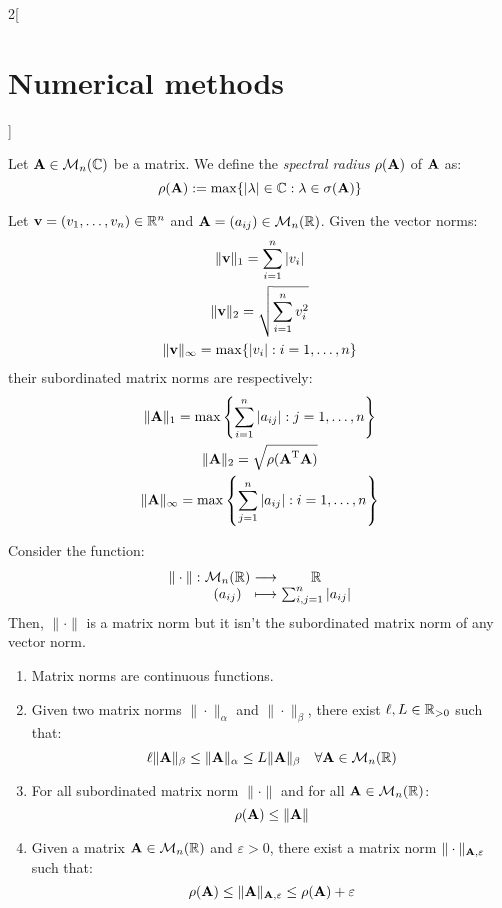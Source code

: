 \documentclass[../../../main_math.tex]{subfiles}
\begin{document}
\begin{multicols}{2}[\section{Numerical methods}]
\begin{definition}
    Let $\boldsymbol{\mathrm{A}}\in\mathcal{M}_n(\mathbb{C})$ be a matrix. We define the \emph{spectral radius} $\rho(\boldsymbol{\mathrm{A}})$ of $\boldsymbol{\mathrm{A}}$ as: $$\rho(\boldsymbol{\mathrm{A}}):=\max\{|\lambda|\in\mathbb{C}:\lambda\in\sigma(\boldsymbol{\mathrm{A}})\}$$
  \end{definition}
  \begin{proposition}
    Let $\boldsymbol{\mathrm{v}}=(v_1,\ldots,v_n)\in\mathbb{R}^n$ and $\boldsymbol{\mathrm{A}}=(a_{ij})\in\mathcal{M}_n(\mathbb{R})$. Given the vector norms:
    \begin{gather*}
      \|\boldsymbol{\mathrm{v}}\|_1=\sum_{i=1}^n|v_i|\\
      \|\boldsymbol{\mathrm{v}}\|_2=\sqrt{\sum_{i=1}^nv_i^2}\\
      \|\boldsymbol{\mathrm{v}}\|_\infty=\max\{|v_i|:i=1,\ldots,n\}
    \end{gather*}
    their subordinated matrix norms are respectively:
    \begin{gather*}
      \|\boldsymbol{\mathrm{A}}\|_1=\max\left\{\sum_{i=1}^n|a_{ij}|:j=1,\ldots,n\right\}\\
      \|\boldsymbol{\mathrm{A}}\|_2=\sqrt{\rho({\boldsymbol{\mathrm{A}}}^{\mathrm{T}}\boldsymbol{\mathrm{A}})}\\
      \|\boldsymbol{\mathrm{A}}\|_\infty=\max\left\{\sum_{j=1}^n|a_{ij}|:i=1,\ldots,n\right\}
    \end{gather*}
  \end{proposition}
  \begin{proposition}
    Consider the function: $$\function{\|\cdot\|}{\mathcal{M}_n(\RR)}{\RR}{(a_{ij})}{\sum_{i,j=1}^n|a_{ij}|}$$ Then, $\|\cdot\|$ is a matrix norm but it isn't the subordinated matrix norm of any vector norm.
  \end{proposition}
  \begin{proposition}
    \hfill
    \begin{enumerate}
      \item Matrix norms are continuous functions.
      \item Given two matrix norms $\|\cdot\|_\alpha$ and $\|\cdot\|_\beta$, there exist $\ell, L\in\mathbb{R}_{>0}$ such that: $$\ell \|\boldsymbol{\mathrm{A}}\|_\beta\leq\|\boldsymbol{\mathrm{A}}\|_\alpha\leq L\|\boldsymbol{\mathrm{A}}\|_\beta\quad\forall\boldsymbol{\mathrm{A}}\in\mathcal{M}_n(\mathbb{R})$$
      \item For all subordinated matrix norm $\|\cdot\|$ and for all $\boldsymbol{\mathrm{A}}\in\mathcal{M}_n(\mathbb{R})$: $$\rho(\boldsymbol{\mathrm{A}})\leq\|\boldsymbol{\mathrm{A}}\|$$
      \item Given a matrix $\boldsymbol{\mathrm{A}}\in\mathcal{M}_n(\mathbb{R})$ and $\varepsilon>0$, there exist a matrix norm $\|\cdot\|_{\boldsymbol{\mathrm{A}},\varepsilon}$ such that: $$\rho(\boldsymbol{\mathrm{A}})\leq\|\boldsymbol{\mathrm{A}}\|_{\boldsymbol{\mathrm{A}},\varepsilon}\leq\rho(\boldsymbol{\mathrm{A}})+\varepsilon$$
    \end{enumerate}

\end{proposition}
\end{multicols}
\end{document}
